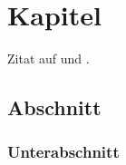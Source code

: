 \chapter{Kapitel}
Zitat auf \cite{Klein2006} und \cite{Bielawa1992}.
\Blindtext
\section{Abschnitt}
\Blindtext
\subsection{Unterabschnitt}
\Blindtext